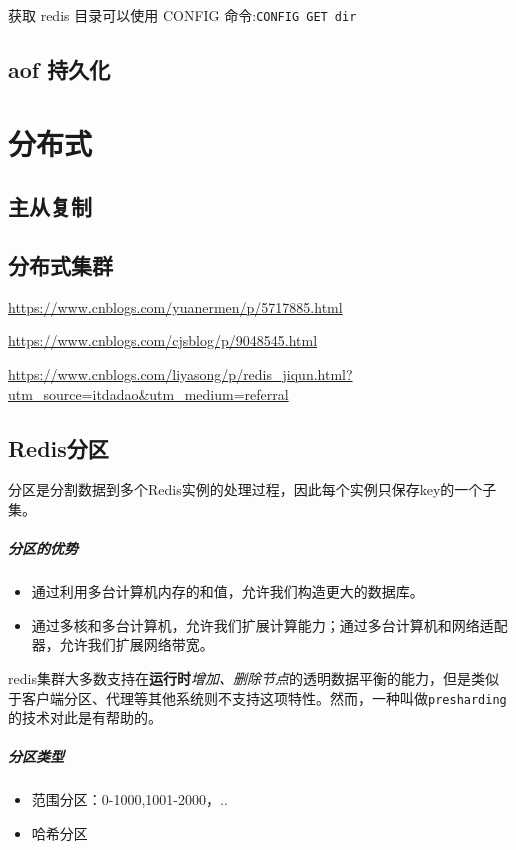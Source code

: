 \documentclass[UTF8,a4paper,12pt]{ctexbook}
\begin{document}
			获取 redis 目录可以使用 CONFIG 命令:\verb|CONFIG GET dir|
	
	\section{aof 持久化}
	

\chapter{分布式}	
	\section{主从复制}
	
	\section{分布式集群}
		\url{https://www.cnblogs.com/yuanermen/p/5717885.html}
		
		\url{https://www.cnblogs.com/cjsblog/p/9048545.html}
		
		
		\url{https://www.cnblogs.com/liyasong/p/redis_jiqun.html?utm_source=itdadao&utm_medium=referral}
		
	\section{Redis分区}
		分区是分割数据到多个Redis实例的处理过程，因此每个实例只保存key的一个子集。

		\paragraph{分区的优势}
			\begin{itemize}
				\item 通过利用多台计算机内存的和值，允许我们构造更大的数据库。
				\item 通过多核和多台计算机，允许我们扩展计算能力；通过多台计算机和网络适配器，允许我们扩展网络带宽。
			\end{itemize}
		
		redis集群大多数支持在\textbf{运行时}\textit{增加、删除节点}的透明数据平衡的能力，但是类似于客户端分区、代理等其他系统则不支持这项特性。然而，一种叫做\verb|presharding|的技术对此是有帮助的。
		
		\paragraph{分区类型}
			\begin{itemize}
				\item 范围分区：0-1000,1001-2000，..
				\item 哈希分区
			\end{itemize}
			
\end{document}
